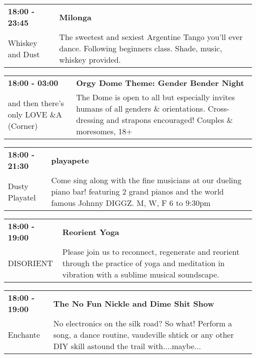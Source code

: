 \begin{tabular}{ p{1in} p{2.2in} }
    \textbf{18:00 - 23:45} & \textbf{Milonga} \\
    Whiskey and Dust \newline  & The sweetest and sexiest Argentine Tango you'll ever dance. Following beginners class. Shade, music, whiskey provided. \\
    \hline 
\end{tabular}
    
\begin{tabular}{ p{1in} p{2.2in} }
    \textbf{18:00 - 03:00} & \textbf{Orgy Dome Theme: Gender Bender Night} \\
    and then there's only LOVE \newline 4\&A (Corner) & The Dome is open to all but especially invites humans of all genders \& orientations. Cross-dressing and strapons encouraged! Couples \& moresomes, 18+ \\
    \hline 
\end{tabular}
    
\begin{tabular}{ p{1in} p{2.2in} }
    \textbf{18:00 - 21:30} & \textbf{playapete} \\
    Dusty Playatel \newline  & Come sing along with the fine musicians at our dueling piano bar! featuring 2 grand pianos and the world famous Johnny DIGGZ.  M, W, F  6 to 9:30pm \\
    \hline 
\end{tabular}
    
\begin{tabular}{ p{1in} p{2.2in} }
    \textbf{18:00 - 19:00} & \textbf{Reorient Yoga} \\
    DISORIENT \newline  & Please join us to reconnect, regenerate and reorient through the practice of yoga and meditation in vibration with a sublime musical soundscape. \\
    \hline 
\end{tabular}
    
\begin{tabular}{ p{1in} p{2.2in} }
    \textbf{18:00 - 19:00} & \textbf{The No Fun Nickle and Dime Shit Show} \\
    Enchante \newline  & No electronics on the silk road? So what! Perform a song, a dance routine, vaudeville shtick or any other DIY skill astound the trail with....maybe... \\
    \hline 
\end{tabular}
    
